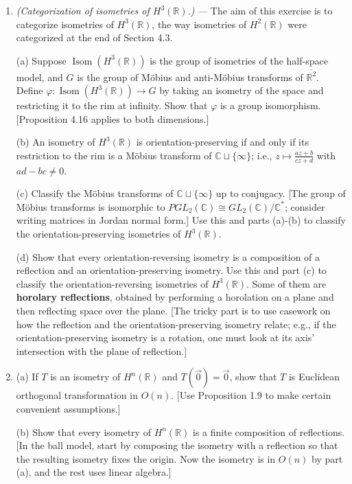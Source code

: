 \documentclass[leqno]{book}
\begin{document}
\begin{enumerate}
\item\emph{(Categorization of isometries of $H^3(\mathbb R)$.)} \---- The aim of this exercise is to categorize isometries of $H^3(\mathbb R)$, the way isometries of $H^2(\mathbb R)$ were categorized at the end of Section 4.3.

(a) Suppose $\operatorname{Isom}(H^3(\mathbb R))$ is the group of isometries of the half-space model, and $G$ is the group of M\"obius and anti-M\"obius transforms of $\overline{\mathbb R^2}$.  Define $\varphi:\operatorname{Isom}(H^3(\mathbb R))\to G$ by taking an isometry of the space and restricting it to the rim at infinity.  Show that $\varphi$ is a group isomorphism. [Proposition 4.16 applies to both dimensions.]

(b) An isometry of $H^3(\mathbb R)$ is orientation-preserving if and only if its restriction to the rim is a M\"obius transform of $\mathbb C\sqcup\{\infty\}$; i.e., $z\mapsto\frac{az+b}{cz+d}$ with $ad-bc\ne 0$.

(c) Classify the M\"obius transforms of $\mathbb C\sqcup\{\infty\}$ up to conjugacy.  [The group of M\"obius transforms is isomorphic to $PGL_2(\mathbb C)\cong GL_2(\mathbb C)/\mathbb C^*$; consider writing matrices in Jordan normal form.]  Use this and parts (a)-(b) to classify the orientation-preserving isometries of $H^3(\mathbb R)$.

(d) Show that every orientation-reversing isometry is a composition of a reflection and an orientation-preserving isometry.  Use this and part (c) to classify the orientation-reversing isometries of $H^3(\mathbb R)$.  Some of them are \textbf{horolary reflections}, obtained by performing a horolation on a plane and then reflecting space over the plane.  [The tricky part is to use casework on how the reflection and the orientation-preserving isometry relate; e.g., if the orientation-preserving isometry is a rotation, one must look at its axis' intersection with the plane of reflection.]

\item (a) If $T$ is an isometry of $H^n(\mathbb R)$ and $T(\vec 0)=\vec 0$, show that $T$ is Euclidean orthogonal transformation in $O(n)$.  [Use Proposition 1.9 to make certain convenient assumptions.]

(b) Show that every isometry of $H^n(\mathbb R)$ is a finite composition of reflections.  [In the ball model, start by composing the isometry with a reflection so that the resulting isometry fixes the origin.  Now the isometry is in $O(n)$ by part (a), and the rest uses linear algebra.]


\end{enumerate}
\end{document}
